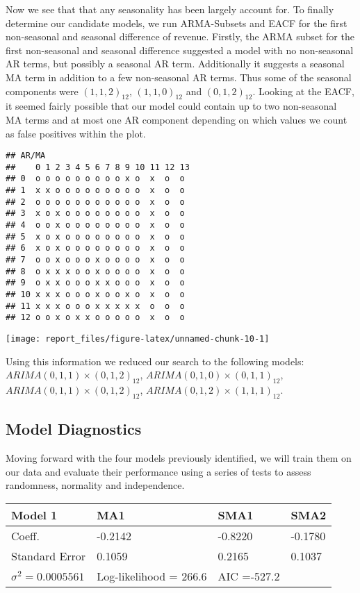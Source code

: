 \documentclass[
]{article}
\begin{document}
Now we see that that any seasonality has been largely account for. To
finally determine our candidate models, we run ARMA-Subsets and EACF for
the first non-seasonal and seasonal difference of revenue. Firstly, the
ARMA subset for the first non-seasonal and seasonal difference suggested
a model with no non-seasonal AR terms, but possibly a seasonal AR term.
Additionally it suggests a seasonal MA term in addition to a few
non-seasonal AR terms. Thus some of the seasonal components were
\((1,1,2)_{12}\), \((1,1,0)_{12}\) and \((0,1,2)_{12}\). Looking at the
EACF, it seemed fairly possible that our model could contain up to two
non-seasonal MA terms and at most one AR component depending on which
values we count as false positives within the plot.

\begin{verbatim}
## AR/MA
##    0 1 2 3 4 5 6 7 8 9 10 11 12 13
## 0  o o o o o o o o o x o  x  o  o 
## 1  x x o o o o o o o o o  x  o  o 
## 2  o o o o o o o o o o o  x  o  o 
## 3  x o x o o o o o o o o  x  o  o 
## 4  o o x o o o o o o o o  x  o  o 
## 5  x o x o o o o o o o o  x  o  o 
## 6  x o x o o o o o o o o  x  o  o 
## 7  o o x o o o x o o o o  x  o  o 
## 8  o x x x o o x o o o o  x  o  o 
## 9  o x x o o o x x o o o  x  o  o 
## 10 x x x o o o x o o x o  x  o  o 
## 11 x x x o o o x x x x x  o  o  o 
## 12 o o x o x x o o o o o  x  o  o
\end{verbatim}

\begin{center}\texttt{[image: report\_files/figure-latex/unnamed-chunk-10-1]} \end{center}

Using this information we reduced our search to the following models:
\(ARIMA(0,1,1)\times(0,1,2)_{12}\), \(ARIMA(0,1,0)\times(0,1,1)_{12}\),
\(ARIMA(0,1,1)\times(0,1,2)_{12}\), \(ARIMA(0,1,2)\times(1,1,1)_{12}\).

\subsection{Model Diagnostics}

Moving forward with the four models previously identified, we will train
them on our data and evaluate their performance using a series of tests
to assess randomness, normality and independence.

\begin{longtable}[]{@{}llll@{}}
\toprule
Model 1 & MA1 & SMA1 & SMA2\tabularnewline
\midrule
\endhead
Coeff. & -0.2142 & -0.8220 & -0.1780\tabularnewline
Standard Error & 0.1059 & 0.2165 & 0.1037\tabularnewline
\(\sigma^2 = 0.0005561\) & Log-likelihood = 266.6 & AIC =-527.2
&\tabularnewline
\bottomrule
\end{longtable}
\end{document}
